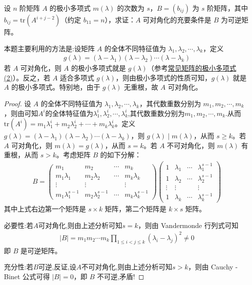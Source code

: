 \documentclass[../../main.tex]{subfiles}
\begin{document}
\begin{proposition}
设 $n$ 阶矩阵 $A$ 的极小多项式 $m(\lambda)$ 的次数为 $s$，$B = (b_{ij})$ 为 $s$ 阶矩阵，其中 $b_{ij}=\mathrm{tr}(A^{i + j - 2})$（约定 $b_{11}=n$），求证：$A$ 可对角化的充要条件是 $B$ 为可逆矩阵。
\end{proposition}
\begin{remark}
本题主要利用的方法是:设矩阵 $A$ 的全体不同特征值为 $\lambda_1,\lambda_2,\cdots,\lambda_k$，定义
\begin{align*}
g(\lambda)=(\lambda - \lambda_1)(\lambda - \lambda_2)\cdots(\lambda - \lambda_k)
\end{align*}
若 $A$ 可对角化，则 $A$ 的极小多项式就是 $g(\lambda)$（参考\hyperref[proposition:常见矩阵的极小多项式]{常见矩阵的极小多项式(2)}）。反之，若 $A$ 适合多项式 $g(\lambda)$，则由极小多项式的性质可知，$g(\lambda)$ 就是 $A$ 的极小多项式。特别地，由于 $g(\lambda)$ 无重根，故 $A$ 可对角化。
\end{remark}
\begin{proof}
设 $A$ 的全体不同特征值为 $\lambda_1,\lambda_2,\cdots,\lambda_k$，其代数重数分别为 $m_1,m_2,\cdots,m_k$，则由可知$A^i$的全体特征值为$\lambda^i_1,\lambda^i_2,\cdots,\lambda^i_k$,其代数重数分别为$m_1,m_2,\cdots,m_k$.从而$\mathrm{tr}(A^i)=m_1\lambda_1^i + m_2\lambda_2^i + \cdots + m_k\lambda_k^i$。定义 $g(\lambda)=(\lambda - \lambda_1)(\lambda - \lambda_2)\cdots(\lambda - \lambda_k)$，则 $g(\lambda)\mid m(\lambda)$，从而 $s\geq k$。若 $A$ 可对角化，则 $m(\lambda)=g(\lambda)$，从而 $s = k$。若 $A$ 不可对角化，则 $m(\lambda)$ 有重根，从而 $s > k$。考虑矩阵 $B$ 的如下分解：
\begin{align*}
B=\begin{pmatrix}
m_1 & m_2 & \cdots & m_k \\
m_1\lambda_1 & m_2\lambda_2 & \cdots & m_k\lambda_k \\
\vdots & \vdots & & \vdots \\
m_1\lambda_1^{s - 1} & m_2\lambda_2^{s - 1} & \cdots & m_k\lambda_k^{s - 1}
\end{pmatrix}\begin{pmatrix}
1 & \lambda_1 & \cdots & \lambda_1^{s - 1} \\
1 & \lambda_2 & \cdots & \lambda_2^{s - 1} \\
\vdots & \vdots & & \vdots \\
1 & \lambda_k & \cdots & \lambda_k^{s - 1}
\end{pmatrix}
\end{align*}
其中上式右边第一个矩阵是 $s\times k$ 矩阵，第二个矩阵是 $k\times s$ 矩阵。

{\heiti 必要性:}若$A$可对角化,则由上述分析可知$s = k$，则由 Vandermonde 行列式可知
\begin{align*}
|B|=m_1m_2\cdots m_k\prod_{1\leq i < j\leq k}(\lambda_i - \lambda_j)^2\neq 0
\end{align*}
即 $B$ 是可逆矩阵。

{\heiti 充分性:}若$B$可逆,反证,设$A$不可对角化,则由上述分析可知$s > k$，则由 Cauchy - Binet 公式可得 $|B| = 0$，即 $B$ 不可逆,矛盾!
\end{proof}
\end{document}
